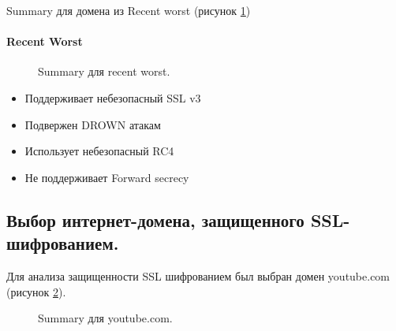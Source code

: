 \documentclass[10pt,a4paper]{report}
\begin{document}
Summary для домена из Recent worst (рисунок \ref{Img:2})

\paragraph {Recent Worst\\}

\begin{figure}[h!]	
	\caption{Summary для recent worst.}
	\label{Img:2}
\end{figure}

\begin{itemize}
	\item Поддерживает небезопасный SSL v3
	\item Подвержен DROWN атакам
	\item Использует небезопасный RC4
	\item Не поддерживает Forward secrecy 
\end{itemize}

\subsection{Выбор интернет-домена, защищенного SSL-шифрованием.}
Для анализа защищенности SSL шифрованием был выбран домен youtube.com (рисунок \ref{Img:3}).

\begin{figure}[h!]	
	\caption{Summary для youtube.com.}
	\label{Img:3}
\end{figure}
\pagebreak
\end{document}
